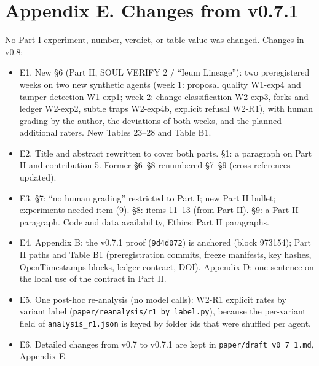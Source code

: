 \documentclass[10pt]{article}
\providecommand{\tightlist}{\setlength{\itemsep}{0pt}\setlength{\parskip}{0pt}}
\begin{document}
\section{Appendix E. Changes from v0.7.1}\label{appendix-e.-changes-from-v0.7.1}

No Part I experiment, number, verdict, or table value was changed. Changes in v0.8:

\begin{itemize}
\tightlist
\item
  E1. New §6 (Part II, SOUL VERIFY 2 / ``Ieum Lineage''): two preregistered weeks on two new synthetic agents (week 1: proposal quality W1-exp4 and tamper detection W1-exp1; week 2: change classification W2-exp3, forks and ledger W2-exp2, subtle traps W2-exp4b, explicit refusal W2-R1), with human grading by the author, the deviations of both weeks, and the planned additional raters. New Tables 23--28 and Table B1.
\item
  E2. Title and abstract rewritten to cover both parts. §1: a paragraph on Part II and contribution 5. Former §6--§8 renumbered §7--§9 (cross-references updated).
\item
  E3. §7: ``no human grading'' restricted to Part I; new Part II bullet; experiments needed item (9). §8: items 11--13 (from Part II). §9: a Part II paragraph. Code and data availability, Ethics: Part II paragraphs.
\item
  E4. Appendix B: the v0.7.1 proof (\texttt{9d4d072}) is anchored (block 973154); Part II paths and Table B1 (preregistration commits, freeze manifests, key hashes, OpenTimestamps blocks, ledger contract, DOI). Appendix D: one sentence on the local use of the contract in Part II.
\item
  E5. One post-hoc re-analysis (no model calls): W2-R1 explicit rates by variant label (\texttt{paper/\allowbreak{}reanalysis/\allowbreak{}r1\_\allowbreak{}by\_\allowbreak{}label.\allowbreak{}py}), because the per-variant field of \texttt{analysis\_\allowbreak{}r1.\allowbreak{}json} is keyed by folder ids that were shuffled per agent.
\item
  E6. Detailed changes from v0.7 to v0.7.1 are kept in \texttt{paper/\allowbreak{}draft\_\allowbreak{}v0\_\allowbreak{}7\_\allowbreak{}1.\allowbreak{}md}, Appendix E.
\end{itemize}
\end{document}
